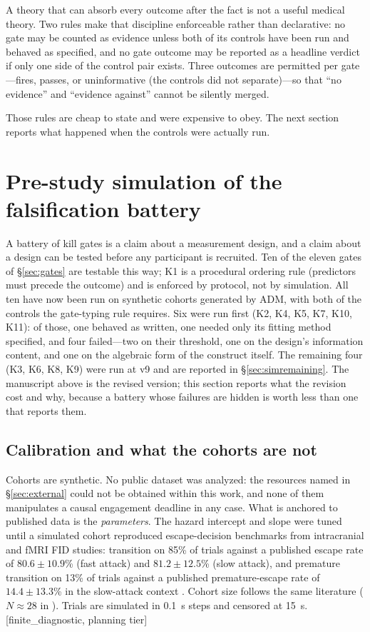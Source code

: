 \documentclass[9pt,twocolumn]{article}
\newcommand{\tier}[1]{{\sffamily\scriptsize\color{RRHMSlate}[#1]}}
\begin{document}
A theory that can absorb every outcome after the fact is not a useful medical theory. Two rules make that discipline enforceable rather than declarative: no gate may be counted as evidence unless both of its controls have been run and behaved as specified, and no gate outcome may be reported as a headline verdict if only one side of the control pair exists. Three outcomes are permitted per gate---fires, passes, or uninformative (the controls did not separate)---so that ``no evidence'' and ``evidence against'' cannot be silently merged.

Those rules are cheap to state and were expensive to obey. The next section reports what happened when the controls were actually run.

\section{Pre-study simulation of the falsification battery}
\label{sec:sim}
A battery of kill gates is a claim about a measurement design, and a claim about a design can be tested before any participant is recruited. Ten of the eleven gates of \S\ref{sec:gates} are testable this way; K1 is a procedural ordering rule (predictors must precede the outcome) and is enforced by protocol, not by simulation. All ten have now been run on synthetic cohorts generated by ADM, with both of the controls the gate-typing rule requires. Six were run first (K2, K4, K5, K7, K10, K11): of those, one behaved as written, one needed only its fitting method specified, and four failed---two on their threshold, one on the design's information content, and one on the algebraic form of the construct itself. The remaining four (K3, K6, K8, K9) were run at v9 and are reported in \S\ref{sec:simremaining}. The manuscript above is the revised version; this section reports what the revision cost and why, because a battery whose failures are hidden is worth less than one that reports them.

\subsection{Calibration and what the cohorts are not}
Cohorts are synthetic. No public dataset was analyzed: the resources named in \S\ref{sec:external} could not be obtained within this work, and none of them manipulates a causal engagement deadline in any case. What is anchored to published data is the \emph{parameters}. The hazard intercept and slope were tuned until a simulated cohort reproduced escape-decision benchmarks from intracranial and fMRI FID studies: transition on 85\% of trials against a published escape rate of $80.6\pm10.9$\% (fast attack) and $81.2\pm12.5$\% (slow attack), and premature transition on 13\% of trials against a published premature-escape rate of $14.4\pm13.3$\% in the slow-attack context \cite{zhang2025escape}. Cohort size follows the same literature ($N\approx28$ in \cite{qi2018}). Trials are simulated in 0.1~s steps and censored at 15~s. \tier{finite\_diagnostic, planning tier}
\end{document}
